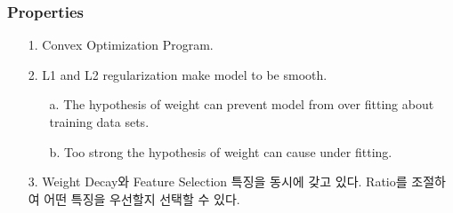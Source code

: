 \documentclass{article}
\begin{document}
\subsubsection{Properties}
\begin{itemize}
    \item [1.] Convex Optimization Program.
    \item [2.] L1 and L2 regularization make model to be smooth.
        \begin{itemize}
            \item[a.] The hypothesis of weight can prevent model from over fitting about training data sets.
            \item[b.] Too strong the hypothesis of weight can cause under fitting.
        \end{itemize}
    \item[3.] Weight Decay와 Feature Selection 특징을 동시에 갖고 있다. Ratio를 조절하여 어떤 특징을 우선할지 선택할 수 있다.
\end{itemize}
\end{document}
